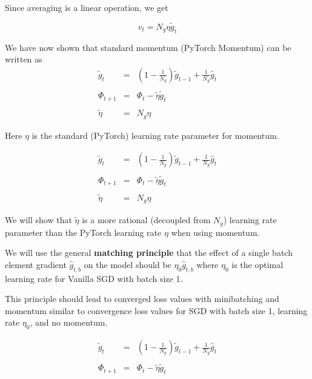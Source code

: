 {\vfill
Since averaging is a linear operation, we get

\vfill
{\color{red} $$v_t = N_g \eta \tilde{g}_t$$}


We have now shown that standard momentum (PyTorch Momentum) can be written as
\begin{eqnarray*}
\tilde{g}_t & = & \left(1-\frac{1}{N_g}\right)\tilde{g}_{t-1} + \frac{1}{N_g} \hat{g}_t \\
\\
\Phi_{t+1} & = &  \Phi_t - \tilde{\eta}\tilde{g}_t \\
\\
\tilde{\eta} & = & N_g\eta
\end{eqnarray*}

Here $\eta$ is the standard (PyTorch) learning rate parameter for momentum.


\begin{eqnarray*}
\tilde{g}_t & = & \left(1-\frac{1}{N_g}\right)\tilde{g}_{t-1} + \frac{1}{N_g} \hat{g}_t \\
\\
\Phi_{t+1} & = &  \Phi_t - \tilde{\eta}\tilde{g}_t \\
\\
\tilde{\eta} & = & N_g\eta
\end{eqnarray*}

\vfill
We will show that $\tilde{\eta}$ is a more rational (decoupled from $N_g$) learning rate parameter than the PyTorch learning rate $\eta$ when using momentum.


We will use the general {\bf matching principle} that the effect of a single batch element gradient $\hat{g}_{t,b}$ on the model
should be $\eta_0\hat{g}_{t,b}$ where $\eta_0$ is the optimal learning rate
for Vanilla SGD with batch size 1.

\vfill
This principle should lead to converged loss values with minibatching and momentum similar to convergence loss values for SGD with batch size 1, learning rate $\eta_0$, and no momentum.


\begin{eqnarray*}
\tilde{g}_t & = & \left(1-\frac{1}{N_g}\right)\tilde{g}_{t-1} + \frac{1}{N_g} \hat{g}_t \\
\\
\Phi_{t+1} & = &  \Phi_t - \tilde{\eta}\tilde{g}_t
\end{eqnarray*}

}
